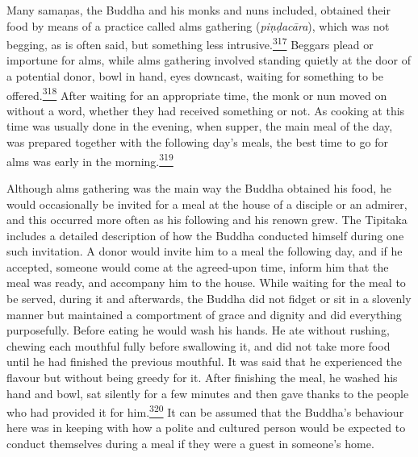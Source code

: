 Many samaṇas, the Buddha and his monks and nuns included, obtained their
food by means of a practice called alms gathering (\emph{piṇḍacāra}),
which was not begging, as is often said, but something less
intrusive.\label{footprints_split_011.html_fnref317}\hyperref[footprints_split_024.htmlux5cux23fn317]{\textsuperscript{317}}
Beggars plead or importune for alms, while alms gathering involved
standing quietly at the door of a potential donor, bowl in hand, eyes
downcast, waiting for something to be
offered.\label{footprints_split_011.html_fnref318}\hyperref[footprints_split_024.htmlux5cux23fn318]{\textsuperscript{318}}
After waiting for an appropriate time, the monk or nun moved on without
a word, whether they had received something or not. As cooking at this
time was usually done in the evening, when supper, the main meal of the
day, was prepared together with the following day's meals, the best time
to go for alms was early in the
morning.\label{footprints_split_011.html_fnref319}\hyperref[footprints_split_024.htmlux5cux23fn319]{\textsuperscript{319}}

Although alms gathering was the main way the Buddha obtained his food,
he would occasionally be invited for a meal at the house of a disciple
or an admirer, and this occurred more often as his following and his
renown grew. The Tipitaka includes a detailed description of how the
Buddha conducted himself during one such invitation. A donor would
invite him to a meal the following day, and if he accepted, someone
would come at the agreed-upon time, inform him that the meal was ready,
and accompany him to the house. While waiting for the meal to be served,
during it and afterwards, the Buddha did not fidget or sit in a slovenly
manner but maintained a comportment of grace and dignity and did
everything purposefully. Before eating he would wash his hands. He ate
without rushing, chewing each mouthful fully before swallowing it, and
did not take more food until he had finished the previous mouthful. It
was said that he experienced the flavour but without being greedy for
it. After finishing the meal, he washed his hand and bowl, sat silently
for a few minutes and then gave thanks to the people who had provided it
for
him.\label{footprints_split_011.html_fnref320}\hyperref[footprints_split_024.htmlux5cux23fn320]{\textsuperscript{320}}
It can be assumed that the Buddha's behaviour here was in keeping with
how a polite and cultured person would be expected to conduct themselves
during a meal if they were a guest in someone's home.

